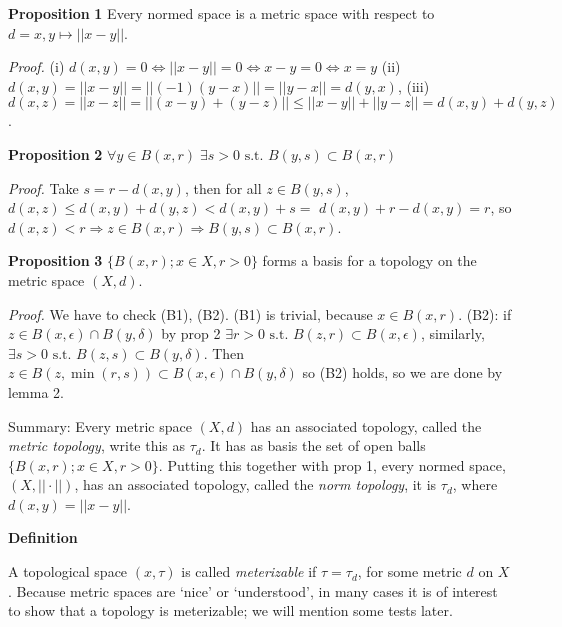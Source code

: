 \documentclass[12pt]{article}
\newcommand{\st}[0]{ \textrm{ s.t. } }
\newcommand{\rimply}[0] { \Rightarrow }
\newcommand{\lrimply}[0] { \Leftrightarrow }
\newcommand{\eps}[0] {  \epsilon }
\begin{document}
\begin{flushleft}
 { \bf Proposition }{ \bf 1 }Every normed space is a metric space with respect to $d = x,y \mapsto ||x-y||$.\begin{flushleft} 
 \emph{Proof.  }(i) $ d(x,y)=0 \lrimply ||x-y||=0 \lrimply x-y = 0 \lrimply x=y$ (ii) $d(x,y) = ||x-y|| = ||(-1)(y-x)|| = ||y-x|| = d(y,x)$, (iii) $d(x,z) = ||x-z|| = ||(x-y)+(y-z)|| \le ||x-y|| + ||y - z|| = d(x,y) + d(y,z)$.\end{flushleft}\end{flushleft}\begin{flushleft} 
 { \bf Proposition }{ \bf 2 }$\forall y \in B(x,r) \; \exists s > 0 \st B(y,s) \subset B(x,r)$\begin{flushleft} 
 \emph{Proof.  }Take $s = r - d(x,y)$, then for all $z \in B(y, s)$, $d(x,z) \le d(x,y) + d(y,z) < d(x,y) + s =$ $ d(x,y) + r - d(x,y) = r$, so $d(x,z) < r \rimply z \in B(x,r) \rimply B(y,s) \subset B(x,r)$.\end{flushleft}\end{flushleft}\begin{flushleft} 
 { \bf Proposition }{ \bf 3 }$\{ B(x, r); x \in X, r>0 \}$ forms a basis for a topology on the metric space $(X, d)$.\begin{flushleft} 
 \emph{Proof.  }We have to check (B1), (B2). (B1) is trivial, because $x \in B(x,r)$. (B2): if $ z \in B(x,\eps) \cap B(y,\delta)$ by prop 2 $\exists r>0 \st B(z,r) \subset B(x,\eps)$, similarly, $\exists s>0 \st B(z,s) \subset B(y,\delta)$. Then $z \in B(z, \min(r,s)) \subset B(x,\eps) \cap B(y,\delta)$ so (B2) holds, so we are done by lemma 2.\end{flushleft}\end{flushleft}\begin{flushleft} 
 Summary: Every metric space $(X, d)$ has an associated topology, called the \emph{metric topology}, write this as $\tau_d$. It has as basis the set of open balls $\{ B(x, r); x \in X, r>0 \}$. Putting this together with prop 1, every normed space, $(X, || \cdot ||)$, has an associated topology, called the \emph{norm topology}, it is $\tau_d$, where $d(x,y) = ||x-y||$.\end{flushleft}\begin{flushleft} 
 { \bf Definition }\end{flushleft}A topological space $(x, \tau)$ is called \emph{meterizable} if $\tau = \tau_d$, for some metric $d$ on $X$. Because metric spaces are `nice' or `understood', in many cases it is of interest to show that a topology is meterizable; we will mention some tests later.\begin{flushleft} 

\end{flushleft}
\end{document}
